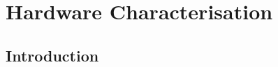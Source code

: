 \chapter{Hardware Characterisation}
\label{chap:hardware}
\chaptoc{}


\newpage
\section{Introduction}
\label{sec:hardware_intro}
\begin{colsection}


\begin{colsection}


\end{colsection}


\end{colsection}


\newpage
